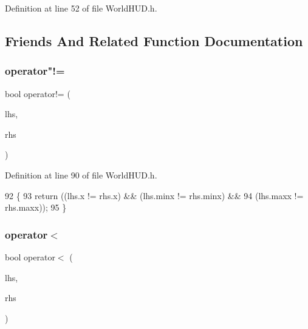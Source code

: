 Definition at line 52 of file World\+H\+U\+D.\+h.



\subsection{Friends And Related Function Documentation}
\mbox{\label{structnjli_1_1_j_l_i_glyph_position_aa324a7eb79043aebc5e1c41c8cffbd00}} 
\subsubsection{\texorpdfstring{operator"!=}{operator!=}}
{\footnotesize\ttfamily bool operator!= (\begin{DoxyParamCaption}\item[{const \mbox{\hyperlink{structnjli_1_1_j_l_i_glyph_position}{J\+L\+I\+Glyph\+Position}} \&}]{lhs,  }\item[{const \mbox{\hyperlink{structnjli_1_1_j_l_i_glyph_position}{J\+L\+I\+Glyph\+Position}} \&}]{rhs }\end{DoxyParamCaption})\hspace{0.3cm}{\ttfamily [friend]}}



Definition at line 90 of file World\+H\+U\+D.\+h.


\begin{DoxyCode}
92     \{
93       \textcolor{keywordflow}{return} ((lhs.x != rhs.x) && (lhs.minx != rhs.minx) &&
94               (lhs.maxx != rhs.maxx));
95     \}
\end{DoxyCode}
\mbox{\label{structnjli_1_1_j_l_i_glyph_position_ab5ffd6bb77fffd445c0d9f38ea8621e5}} 
\subsubsection{\texorpdfstring{operator$<$}{operator<}}
{\footnotesize\ttfamily bool operator$<$ (\begin{DoxyParamCaption}\item[{const \mbox{\hyperlink{structnjli_1_1_j_l_i_glyph_position}{J\+L\+I\+Glyph\+Position}} \&}]{lhs,  }\item[{const \mbox{\hyperlink{structnjli_1_1_j_l_i_glyph_position}{J\+L\+I\+Glyph\+Position}} \&}]{rhs }\end{DoxyParamCaption})\hspace{0.3cm}{\ttfamily [friend]}}



